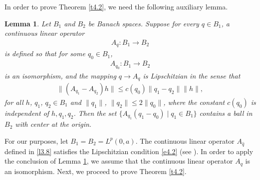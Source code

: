 \documentclass[reqno,12pt,centertags]{amsart}
\numberwithin{equation}{section}
\newtheorem{lemma}[theorem]{Lemma}
\theoremstyle{definition}
\begin{document}
In order to prove Theorem \ref{t4.2}, we need the following auxiliary lemma.
\begin{lemma}\cite[Lemma 2.1]{Horv2005}\label{l4.5}
Let $B_1$ and $B_2$ be Banach spaces.  Suppose for every $q \in B_1$, a continuous linear operator
\begin{align*}
A_q: B_1 \rightarrow B_2
\end{align*}
is defined so that for some $q_0 \in B_1$, 
\begin{align*}
A_{q_0}: B_1 \rightarrow B_2
\end{align*}
is an isomorphism, and the mapping $q \rightarrow A_q$ is Lipschitzian in the sense that
\begin{align}\label{e4.2}
\|(A_{q_1}-A_{q_2})h\| 
\leq c(q_0)\|q_1-q_2\|\|h\|,
\end{align}
for all $h$, $q_1$, $q_2\in B_1$ and $\|q_1\|$, $\|q_2\| \leq 2\|q_0\|$,
where the constant $c(q_0)$ is independent of $h, q_1, q_2$. Then the set $\{A_{q_1}(q_1-q_0)\mid q_1\in B_1\}$ contains a ball in $B_2$ with center at the origin.
\end{lemma}

For our purposes, let $B_1=B_2=L^p(0, a)$. The continuous linear operator $A_{\hat{q}}$ defined in \eqref{l3.8} satisfies the Lipschitzian condition \eqref{e4.2} (see \cite[Lemma 6.1]{XYB2023}). In order to apply the conclusion of Lemma \ref{l4.5}, we assume that the continuous linear operator $A_q$ is an isomorphism. Next, we proceed to prove  Theorem \ref{t4.2}. 
\end{document}
